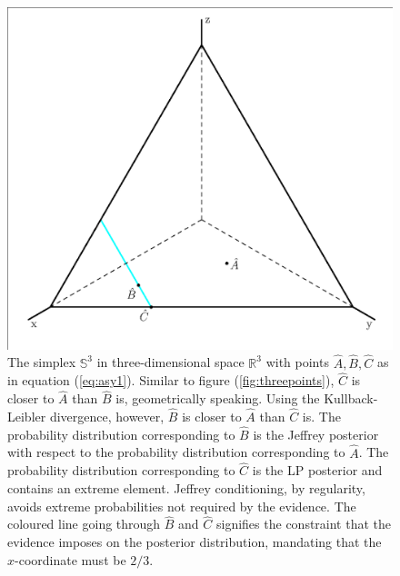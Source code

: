 \documentclass[11pt]{article}
\begin{document}
\begin{figure}[ht]
  \begin{flushright}
    \begin{minipage}[h]{.7\linewidth}
      \includegraphics[width=\textwidth]{threepointshat.eps}
      \caption{\footnotesize The simplex $\mathbb{S}^{3}$ in
        three-dimensional space $\mathbb{R}^{3}$ with points
        $\hat{A},\hat{B},\hat{C}$ as in equation (\ref{eq:asy1}).
        Similar to figure (\ref{fig:threepoints}), $\hat{C}$ is closer
        to $\hat{A}$ than $\hat{B}$ is, geometrically speaking. Using
        the Kullback-Leibler divergence, however, $\hat{B}$ is closer
        to $\hat{A}$ than $\hat{C}$ is. The probability distribution
        corresponding to $\hat{B}$ is the Jeffrey posterior with
        respect to the probability distribution corresponding to
        $\hat{A}$. The probability distribution corresponding to
        $\hat{C}$ is the LP posterior and contains an extreme element.
        Jeffrey conditioning, by regularity, avoids extreme
        probabilities not required by the evidence. The coloured line
        going through $\hat{B}$ and $\hat{C}$ signifies the constraint
        that the evidence imposes on the posterior distribution,
        mandating that the $x$-coordinate must be $2/3$.}
      \label{fig:threepointshat}
    \end{minipage}
  \end{flushright}
\end{figure}
\end{document}
